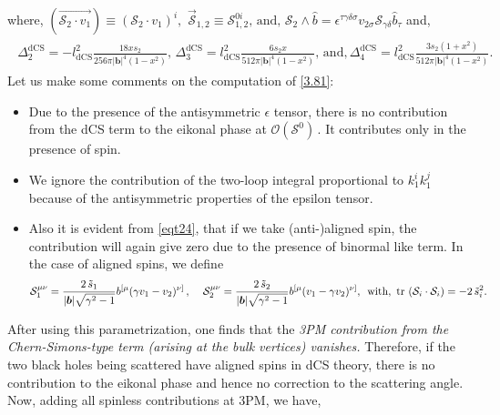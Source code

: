 where, $(\overrightarrow{\mathcal{S}_2\cdot v_1})\equiv (\mathcal{S}_2\cdot v_1)^{i},\,\,\vec {\mathcal{S}}_{1,2}\equiv \mathcal{S}_{1,2}^{0i},\,\textrm{and,} \,\,\mathcal{S}_2\wedge \hat b=\epsilon^{\tau\gamma\delta\sigma}v_{2\sigma}\mathcal{S}_{\gamma\delta}\hat b_{\tau}$ 
and,
\begin{align}
    \begin{split}
\Delta_{\mathfrak{2}}^{\textrm{dCS}}=-l_{\textrm{dCS}}^2 \frac{18 xs_2}{256\pi |\boldsymbol{b}|^4(1-x^2)},\,\Delta_{\mathfrak{3}}^{\textrm{dCS}}=l_{\textrm{dCS}}^2 \frac{6 s_2 x}{512 \pi |\boldsymbol{b}|^4(1-x^2)},\,\textrm{and,}\,\Delta_{\mathfrak{4}}^{\textrm{dCS}}=l_{\textrm{dCS}}^2\frac{3s_2(1+x^2)}{512 \pi|\boldsymbol{b}|^4 (1-x^2)}.
    \end{split}
\end{align}
Let us make some comments on the computation of \eqref{3.81}:
\begin{itemize}
\item Due to the presence of the antisymmetric $\epsilon$ tensor, there is no contribution from the dCS term to the eikonal phase at $\mathcal{O}(\mathcal{S}^0)\,.$ It contributes only in the presence of spin.
    \item We ignore the contribution of the two-loop integral proportional to $k_1^i k_1^j$ because of the antisymmetric properties of the epsilon tensor.
    \item Also it is evident from \eqref{eqt24}, that if we take (anti-)aligned spin, the contribution will again give zero due to the presence of binormal like term. In the case of aligned spins, we define
    \begin{align}
\mathcal{S}_1^{\mu\nu}=\frac{2\,\tilde{s}_1}{|\boldsymbol{b}|\sqrt{\gamma^2-1} }b^{[\mu}(\gamma v_1-v_2)^{\nu]} \,,\hspace{0.4 cm }\mathcal{S}_2^{\mu\nu}=\frac{2\,\tilde{s}_2}{|\boldsymbol{b}|\sqrt{\gamma^2-1} }b^{[\mu}( v_1-\gamma v_2)^{\nu]}, \,\,\, \textrm{with},\,\, {\textrm{tr\,}\,(\mathcal{S}_i\cdot\mathcal{S}_i)=-2 \,\tilde{s}_i^2}.
    \end{align}
      \end{itemize}
      \vspace{-0.89 cm}
   After using this parametrization, one finds that the \textit{3PM contribution from the Chern-Simons-type term (arising at the bulk vertices) vanishes.} Therefore, if the two black holes being scattered have aligned spins in dCS theory, there is no contribution to the eikonal phase and hence no correction to the scattering angle.
Now, adding all spinless contributions at 3PM, we have,

